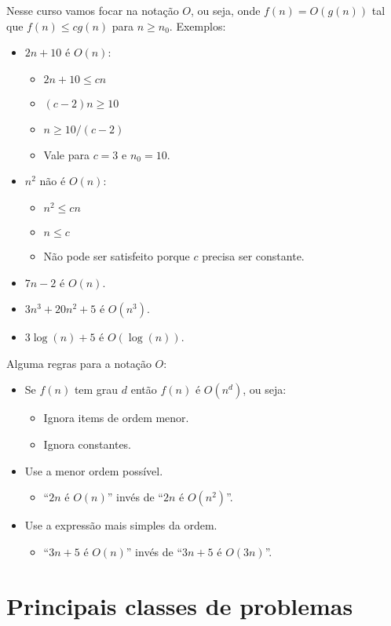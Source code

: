 Nesse curso vamos focar na notação $O$, ou seja, onde $f(n) = O(g(n))$ tal que
$f(n) \leq cg(n)$ para $n \geq n_0$.
Exemplos:
\begin{itemize}
\item $2n + 10$ é $O(n)$:
	\begin{itemize}
	\item $2n + 10 \leq cn$
	\item $(c - 2)n \geq 10$
	\item $n \geq 10/(c - 2)$
	\item Vale para $c = 3$ e $n_0 = 10$.
	\end{itemize}
\item $n^2$ não é $O(n)$:
	\begin{itemize}
	\item $n^2 \leq cn$
	\item $n \leq c$
	\item Não pode ser satisfeito porque $c$ precisa ser constante.
	\end{itemize}
\item $7n - 2$ é $O(n)$.
\item $3n^3 + 20n^2 + 5$ é $O(n^3)$.
\item $3 \log (n) + 5$ é $O(\log (n))$.
\end{itemize}

Alguma regras para a notação $O$:
\begin{itemize}
\item Se $f(n)$ tem grau $d$ então $f(n)$ é $O(n^d)$, ou seja:
	\begin{itemize}
	\item Ignora items de ordem menor.
	\item Ignora constantes.
	\end{itemize}
\item Use a menor ordem possível.
	\begin{itemize}
	\item ``$2n$ é $O(n)$'' invés de ``$2n$ é $O(n^2)$''.
	\end{itemize}
\item Use a expressão mais simples da ordem.
	\begin{itemize}
	\item ``$3n + 5$ é $O(n)$'' invés de ``$3n+5$ é $O(3n)$''.
	\end{itemize}
\end{itemize}

\section{Principais classes de problemas}

